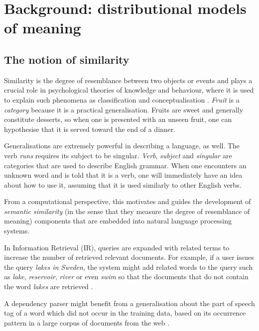 \chapter{Background: distributional models of meaning}
\label{cha:background}

\section{The notion of similarity}
\label{sec:similarity}

Similarity is the degree of resemblance between two objects or events \cite{WCS:WCS1282} and plays a crucial role in psychological theories of knowledge and behaviour, where it is used to explain such phenomena as classification and conceptualisation \cite{Tversky1977,1986-13502-00119860101,medin1993respects,Markman1996,hahn1997concepts}. \textit{Fruit} is a \emph{category} because it is a practical generalisation. Fruits are sweet and generally constitute desserts, so when one is presented with an unseen fruit, one can hypothesise that it is served toward the end of a dinner.

Generalisations are extremely powerful in describing a language, as well. The verb \textit{runs} requires its subject to be singular. \textit{Verb}, \textit{subject} and \textit{singular} are categories that are used to describe English grammar. When one encounters an unknown word and is told that it is a verb, one will immediately have an idea about how to use it, assuming that it is used similarly to other English verbs.

From a computational perspective, this motivates and guides the development of \emph{semantic similarity} (in the sense that they measure the degree of resemblance of meaning) components that are embedded into natural language processing systems.

In Information Retrieval (IR), queries are expanded with related terms to increase the number of retrieved relevant documents. For example, if a user issues the query \textit{lakes in Sweden}, the system might add related words to the query such as \textit{lake}, \textit{reservoir}, \textit{river} or even \textit{swim} so that the documents that do not contain the word \textit{lakes} are retrieved \cite{Xu:1996:QEU:243199.243202}.

A dependency parser might benefit from a generalisation about the part of speech tag of a word which did not occur in the training data, based on its occurrence pattern in a large corpus of documents from the web \cite{hermann-blunsom:2013:ACL2013,andreas-klein:2014:P14-2}.

